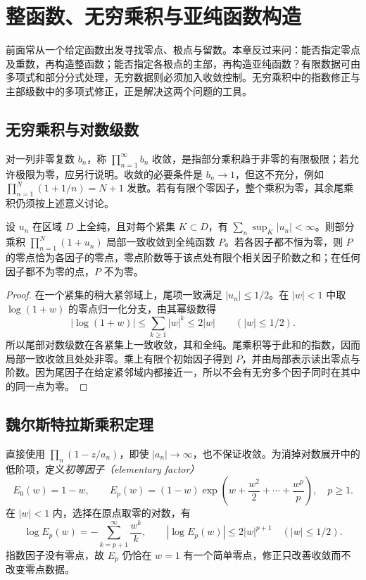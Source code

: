 \setcounter{chapter}{14} %
\chapter{整函数、无穷乘积与亚纯函数构造}
\label{chap:ca-entire}

前面常从一个给定函数出发寻找零点、极点与留数。本章反过来问：能否指定零点及重数，再构造整函数；能否指定各极点的主部，再构造亚纯函数？有限数据可由多项式和部分分式处理，无穷数据则必须加入收敛控制。无穷乘积中的指数修正与主部级数中的多项式修正，正是解决这两个问题的工具。

\section{无穷乘积与对数级数}

对一列非零复数 $b_n$，称 $\prod_{n=1}^{\infty}b_n$ 收敛，是指部分乘积趋于非零的有限极限；若允许极限为零，应另行说明。收敛的必要条件是 $b_n\to1$，但这不充分，例如 $\prod_{n=1}^N(1+1/n)=N+1$ 发散。若有有限个零因子，整个乘积为零，其余尾乘积仍须按上述意义讨论。

\begin{theorem}[局部一致收敛的乘积判别]
\label{thm:ca-product-convergence}
设 $u_n$ 在区域 $D$ 上全纯，且对每个紧集 $K\subset D$，有 $\sum_n\sup_K|u_n|<\infty$。则部分乘积 $\prod_{n=1}^N(1+u_n)$ 局部一致收敛到全纯函数 $P$。若各因子都不恒为零，则 $P$ 的零点恰为各因子的零点，零点阶数等于该点处有限个相关因子阶数之和；在任何因子都不为零的点，$P$ 不为零。
\end{theorem}
\begin{proof}
在一个紧集的稍大紧邻域上，尾项一致满足 $|u_n|\le1/2$。在 $|w|<1$ 中取 $\log(1+w)$ 的零点归一化分支，由其幂级数得
\[
 |\log(1+w)|\le\sum_{k\ge1}|w|^k\le2|w|\qquad(|w|\le1/2).
\]
所以尾部对数级数在各紧集上一致收敛，其和全纯。尾乘积等于此和的指数，因而局部一致收敛且处处非零。乘上有限个初始因子得到 $P$，并由局部表示读出零点与阶数。因为尾因子在给定紧邻域内都接近一，所以不会有无穷多个因子同时在其中的同一点为零。
\end{proof}

\section{魏尔斯特拉斯乘积定理}

直接使用 $\prod_n(1-z/a_n)$，即使 $|a_n|\to\infty$，也不保证收敛。为消掉对数展开中的低阶项，定义\emph{初等因子（elementary factor）}
\begin{equation}
 E_0(w)=1-w,\qquad
 E_p(w)=(1-w)\exp\left(w+\frac{w^2}{2}+\cdots+\frac{w^p}{p}\right),\quad p\ge1.
 \label{eq:ca-elementary-factors}
\end{equation}
在 $|w|<1$ 内，选择在原点取零的对数，有
\begin{equation}
 \log E_p(w)=-\sum_{k=p+1}^{\infty}\frac{w^k}{k},\qquad
 |\log E_p(w)|\le2|w|^{p+1}\quad(|w|\le1/2).
 \label{eq:ca-factor-estimate}
\end{equation}
指数因子没有零点，故 $E_p$ 仍恰在 $w=1$ 有一个简单零点，修正只改善收敛而不改变零点数据。

